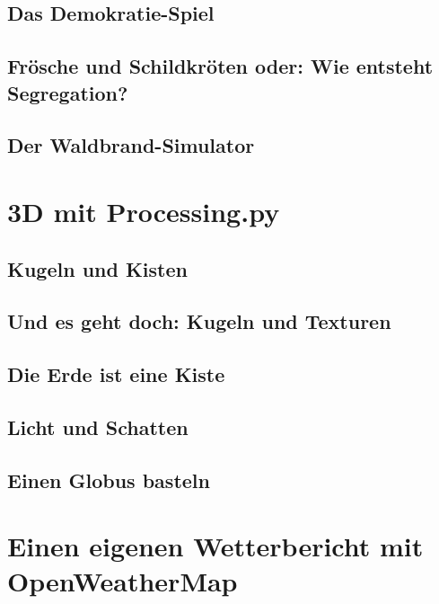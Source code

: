 \documentclass[10pt,german,]{book}
\begin{document}
\section{Das Demokratie-Spiel}\label{das-demokratie-spiel}

\section{Frösche und Schildkröten oder: Wie entsteht
Segregation?}\label{fruxf6sche-und-schildkruxf6ten-oder-wie-entsteht-segregation}

\section{Der Waldbrand-Simulator}\label{der-waldbrand-simulator}

\chapter{3D mit Processing.py}\label{d-mit-processing.py}

\section{Kugeln und Kisten}\label{kugeln-und-kisten}

\section{Und es geht doch: Kugeln und
Texturen}\label{und-es-geht-doch-kugeln-und-texturen}

\section{Die Erde ist eine Kiste}\label{die-erde-ist-eine-kiste}

\section{Licht und Schatten}\label{licht-und-schatten}

\section{Einen Globus basteln}\label{einen-globus-basteln}

\chapter{Einen eigenen Wetterbericht mit
OpenWeatherMap}\label{einen-eigenen-wetterbericht-mit-openweathermap}
\end{document}
